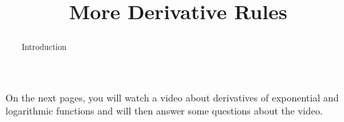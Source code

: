 \documentclass[handout]{ximera}
\title{More Derivative Rules}
\begin{document}
\begin{abstract} Introduction %
\end{abstract}

\maketitle

On the next pages, you will watch a video about derivatives of exponential and logarithmic functions and will then answer some questions about the video.
\end{document}
